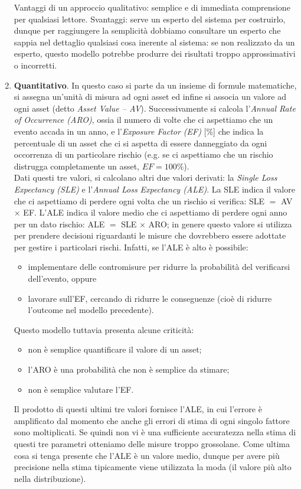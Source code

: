 \begin{enumerate}
\begin{enumerate}
	\end{enumerate}
	Vantaggi di un approccio qualitativo: semplice e di immediata comprensione per qualsiasi lettore. Svantaggi: serve un esperto del sistema per costruirlo, dunque per raggiungere la semplicità dobbiamo consultare un esperto che sappia nel dettaglio qualsiasi cosa inerente al sistema: se non realizzato da un esperto, questo modello potrebbe produrre dei risultati troppo approssimativi o incorretti.
	\item \textbf{Quantitativo}. In questo caso si parte da un insieme di formule matematiche, si assegna un'unità di misura ad ogni asset ed infine si associa un valore ad ogni asset (detto \textit{Asset Value -- AV}). Successivamente si calcola l'\textit{Annual Rate of Occurrence (ARO)}, ossia il numero di volte che ci aspettiamo che un evento accada in un anno, e l'\textit{Exposure Factor (EF)} [\%] che indica la percentuale di un asset che ci si aspetta di essere danneggiato da ogni occorrenza di un particolare rischio (e.g. se ci aspettiamo che un rischio distrugga completamente un asset, $EF=100\%$).\\
	Dati questi tre valori, si calcolano altri due valori derivati: la \textit{Single Loss Expectancy (SLE)} e l'\textit{Annual Loss Expectancy (ALE)}. La SLE indica il valore che ci aspettiamo di perdere ogni volta che un rischio si verifica: SLE $ = $ AV $\times$ EF. L'ALE indica il valore medio che ci aspettiamo di perdere ogni anno per un dato rischio: ALE $ = $ SLE $\times$ ARO; in genere questo valore si utilizza per prendere decisioni riguardanti le misure che dovrebbero essere adottate per gestire i particolari rischi. Infatti, se l'ALE è alto è possibile:
	\begin{itemize}
		\item implementare delle contromisure per ridurre la probabilità del verificarsi dell'evento, oppure
		\item lavorare sull'EF, cercando di ridurre le conseguenze (cioè di ridurre l'outcome nel modello precedente).
	\end{itemize}
	Questo modello tuttavia presenta alcune criticità:
	\begin{itemize}
		\item non è semplice quantificare il valore di un asset;
		\item l'ARO è una probabilità che non è semplice da stimare;
		\item non è semplice valutare l'EF.
	\end{itemize}
	Il prodotto di questi ultimi tre valori fornisce l'ALE, in cui l'errore è amplificato dal momento che anche gli errori di stima di ogni singolo fattore sono moltiplicati. Se quindi non vi è una sufficiente accuratezza nella stima di questi tre parametri otteniamo delle misure troppo grossolane. Come ultima cosa si tenga presente che l'ALE è un valore medio, dunque per avere più precisione nella stima tipicamente viene utilizzata la moda (il valore più alto nella distribuzione).
\end{enumerate}
